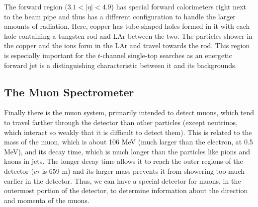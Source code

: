The forward region ($3.1 < |\eta| < 4.9$) has special forward calorimeters right next to the beam pipe and thus has a different configuration to handle the larger amounts of radiation.  Here, copper has tube-shaped holes formed in it with each hole containing a tungsten rod and LAr between the two.  The particles shower in the copper and the ions form in the LAr and travel towards the rod.  This region is especially important for the $t$-channel single-top searches as an energetic forward jet is a distinguishing characteristic between it and its backgrounds.

\subsection{The Muon Spectrometer}
%
Finally there is the muon system, primarily intended to detect muons, which tend to travel farther through the detector than other particles (except neutrinos, which interact so weakly that it is difficult to detect them).  This is related to the mass of the muon, which is about 106 MeV (much larger than the electron, at 0.5 MeV), and its decay time, which is much longer than the particles like pions and kaons in jets.  The longer decay time allows it to reach the outer regions of the detector ($c\tau$ is 659 m) and its larger mass prevents it from showering too much earlier in the detector.  Thus, we can have a special detector for muons, in the outermost portion of the detector, to determine information about the direction and momenta of the muons.  

